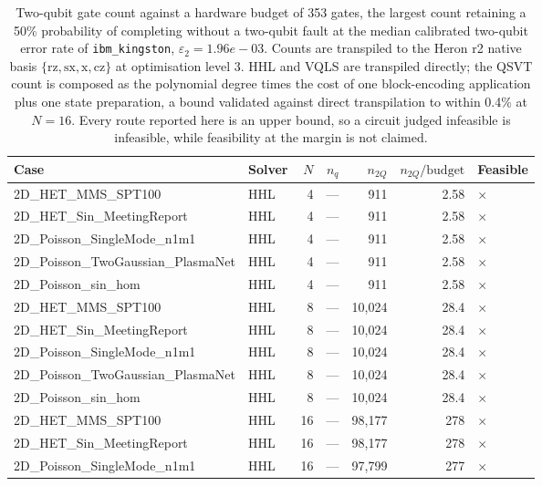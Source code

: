 \begin{table}[htbp]
  \centering
  \caption{Two-qubit gate count against a hardware budget of 353 gates, the largest count retaining a 50\% probability of completing without a two-qubit fault at the median calibrated two-qubit error rate of \texttt{ibm\_kingston}, $\varepsilon_2 = 1.96e-03$. Counts are transpiled to the Heron r2 native basis $\{\mathrm{rz}, \mathrm{sx}, \mathrm{x}, \mathrm{cz}\}$ at optimisation level 3. HHL and VQLS are transpiled directly; the QSVT count is composed as the polynomial degree times the cost of one block-encoding application plus one state preparation, a bound validated against direct transpilation to within 0.4\% at $N=16$. Every route reported here is an upper bound, so a circuit judged infeasible is infeasible, while feasibility at the margin is not claimed.}
  \label{tab:hardware_feasibility}
  \begin{tabular}{llrrrrl}
    \toprule
    Case & Solver & $N$ & $n_q$ & $n_{2Q}$ & $n_{2Q}/\mathrm{budget}$ & Feasible \\
    \midrule
    2D\_HET\_MMS\_SPT100 & HHL & 4 & --- & 911 & 2.58 & $\times$ \\
    2D\_HET\_Sin\_MeetingReport & HHL & 4 & --- & 911 & 2.58 & $\times$ \\
    2D\_Poisson\_SingleMode\_n1m1 & HHL & 4 & --- & 911 & 2.58 & $\times$ \\
    2D\_Poisson\_TwoGaussian\_PlasmaNet & HHL & 4 & --- & 911 & 2.58 & $\times$ \\
    2D\_Poisson\_sin\_hom & HHL & 4 & --- & 911 & 2.58 & $\times$ \\
    2D\_HET\_MMS\_SPT100 & HHL & 8 & --- & 10,024 & 28.4 & $\times$ \\
    2D\_HET\_Sin\_MeetingReport & HHL & 8 & --- & 10,024 & 28.4 & $\times$ \\
    2D\_Poisson\_SingleMode\_n1m1 & HHL & 8 & --- & 10,024 & 28.4 & $\times$ \\
    2D\_Poisson\_TwoGaussian\_PlasmaNet & HHL & 8 & --- & 10,024 & 28.4 & $\times$ \\
    2D\_Poisson\_sin\_hom & HHL & 8 & --- & 10,024 & 28.4 & $\times$ \\
    2D\_HET\_MMS\_SPT100 & HHL & 16 & --- & 98,177 & 278 & $\times$ \\
    2D\_HET\_Sin\_MeetingReport & HHL & 16 & --- & 98,177 & 278 & $\times$ \\
    2D\_Poisson\_SingleMode\_n1m1 & HHL & 16 & --- & 97,799 & 277 & $\times$ \\

\end{tabular}
\end{table}
